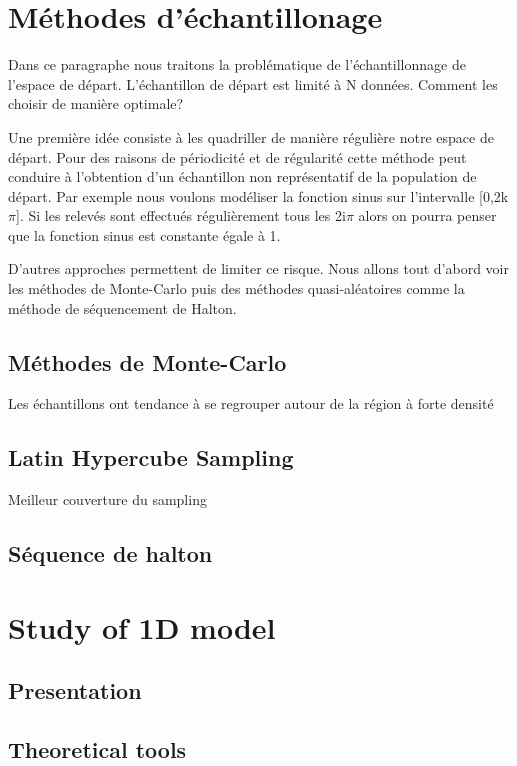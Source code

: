 \documentclass[hidelinks,12pt]{article}
\begin{document}
\section{Méthodes d’échantillonage}

Dans ce paragraphe nous traitons la problématique de l’échantillonnage de l’espace de départ. L’échantillon de départ est limité à N données. Comment les choisir de manière optimale? 

Une première idée consiste à les quadriller de manière régulière notre espace de départ. Pour des raisons de périodicité et de régularité cette méthode peut conduire à l’obtention d’un échantillon non représentatif de la population de départ. Par exemple nous voulons modéliser la fonction sinus sur l’intervalle [0,2k$\pi$]. Si les relevés sont effectués régulièrement tous les 2i$\pi$ alors on pourra penser que la fonction sinus est constante égale à 1. 

D’autres approches permettent de limiter ce risque. Nous allons tout d’abord voir les méthodes de Monte-Carlo puis des méthodes quasi-aléatoires comme la méthode de séquencement de Halton.

\subsection{Méthodes de Monte-Carlo}

Les échantillons ont tendance à se regrouper autour de la région à forte densité


\subsection{Latin Hypercube Sampling}

Meilleur couverture du sampling

\subsection{Séquence de halton}




\section{Study of 1D model}
\subsection{Presentation}
\subsection{Theoretical tools}
\end{document}
